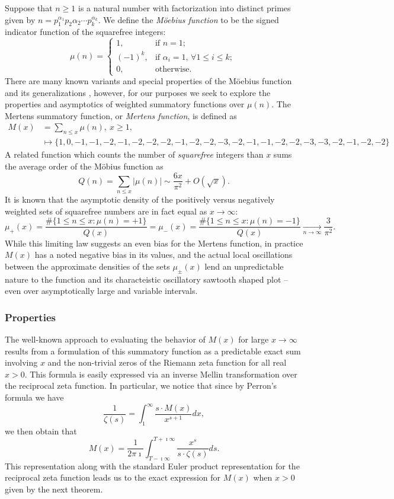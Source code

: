 \documentclass[11pt,reqno,a4letter]{article}
\numberwithin{figure}{section}
\numberwithin{table}{section}
\newcommand{\cf}{\textit{cf.\ }}
\theoremstyle{plain}
\numberwithin{theorem}{section}
\theoremstyle{definition}
\begin{document}
Suppose that $n \geq 1$ is a natural number with factorization into 
distinct primes given by 
$n = p_1^{\alpha_1} p_2{\alpha_2} \cdots p_k^{\alpha_k}$. 
We define the \emph{M\"oebius function} to be the signed indicator function 
of the squarefree integers: 
\[
\mu(n) = \begin{cases} 
     1, & \text{if $n = 1$; } \\ 
     (-1)^k, & \text{if $\alpha_i = 1$, $\forall 1 \leq i \leq k$; } \\ 
     0, & \text{otherwise.} 
     \end{cases} 
\]
There are many known variants and special properties of the M\"oebius function 
and its generalizations \cite[\cf \S 2]{HANDBOOKNT-2004}, however, for our 
purposes we seek to explore the properties and asymptotics of weighted 
summatory functions over $\mu(n)$. 
The Mertens summatory function, or \emph{Mertens function}, is defined as 
\begin{align*} 
M(x) & = \sum_{n \leq x} \mu(n),\ x \geq 1, \\ 
     & \longmapsto \{1, 0, -1, -1, -2, -1, -2, -2, -2, -1, -2, -2, -3, -2, 
     -1, -1, -2, -2, -3, -3, -2, -1, -2, -2\}
\end{align*} 
A related function which counts the 
number of \emph{squarefree} integers than $x$ sums the average order of the M\"obius function as 
\[ 
Q(n) = \sum_{n \leq x} |\mu(n)| \sim \frac{6x}{\pi^2} + O\left(\sqrt{x}\right). 
\] 
It is known that the asymptotic density of the positively versus negatively 
weighted sets of squarefree numbers are in fact equal as $x \rightarrow \infty$: 
\[
\mu_{+}(x) = \frac{\#\{1 \leq n \leq x: \mu(n) = +1\}}{Q(x)} = 
     \mu_{-}(x) = \frac{\#\{1 \leq n \leq x: \mu(n) = -1\}}{Q(x)} 
     \xrightarrow[n \rightarrow \infty]{} \frac{3}{\pi^2}. 
\]
While this limiting law suggests an even bias for the Mertens function, 
in practice $M(x)$ has a noted negative bias in its values, and the actual 
local oscillations between the approximate densities of the sets 
$\mu_{\pm}(x)$ lend an unpredictable nature to the function and its 
characteistic oscillatory sawtooth shaped plot -- even over asymptotically 
large and variable intervals.

\subsubsection{Properties} 

The well-known approach to evaluating the behavior of $M(x)$ for large 
$x \rightarrow \infty$ results from a formulation of this summatory 
function as a predictable exact sum involving $x$ and the non-trivial 
zeros of the Riemann zeta function for all real $x > 0$. 
This formula is easily expressed via an inverse Mellin transformation 
over the reciprocal zeta function. In particular, 
we notice that since by Perron's formula we have 
\[
\frac{1}{\zeta(s)} = \int_1^{\infty} \frac{s \cdot M(x)}{x^{s+1}} dx, 
\]
we then obtain that 
\[
M(x) = \frac{1}{2\pi\imath} \int_{T-\imath\infty}^{T+\imath\infty} 
     \frac{x^s}{s \cdot \zeta(s)} ds. 
\] 
This representation along with the standard Euler product 
representation for the reciprocal zeta function leads us to the 
exact expression for $M(x)$ when $x > 0$ given by the next theorem. 
\end{document}
